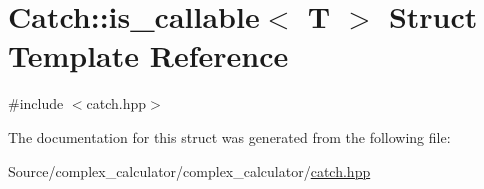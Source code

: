 \hypertarget{struct_catch_1_1is__callable}{}\section{Catch\+:\+:is\+\_\+callable$<$ T $>$ Struct Template Reference}
\label{struct_catch_1_1is__callable}


{\ttfamily \#include $<$catch.\+hpp$>$}



The documentation for this struct was generated from the following file\+:\begin{DoxyCompactItemize}
\item 
Source/complex\+\_\+calculator/complex\+\_\+calculator/\mbox{\hyperlink{catch_8hpp}{catch.\+hpp}}\end{DoxyCompactItemize}
